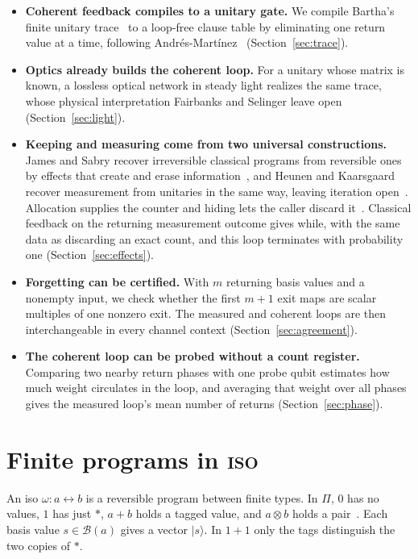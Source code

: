\documentclass[acmsmall,screen,review,anonymous,nonacm]{acmart}
\newcommand{\storyinlineface}{\small\ttfamily}
\newcommand{\code}[1]{\textnormal{\storyinlineface #1}}
\newcommand{\ket}[1]{\lvert #1\rangle}
\numberwithin{equation}{section}
\begin{document}
\begin{itemize}
\item \textbf{Coherent feedback compiles to a unitary gate.} We compile Bartha's finite unitary trace~\cite[Thm.~8]{Bartha14QuantumTuringAutomata} to a loop-free clause table by eliminating one return value at a time, following Andr\'es-Mart\'inez~\cite[proof of Thm.~3.3.15]{AndresMartinez22Thesis} (Section~\ref{sec:trace}).
\item \textbf{Optics already builds the coherent loop.} For a unitary whose matrix is known, a
  lossless optical network in steady light realizes the same trace, whose physical interpretation
  Fairbanks and Selinger leave
  open~\cite[\S~1, App.~B]{FairbanksSelinger25Traces} (Section~\ref{sec:light}).
\item \textbf{Keeping and measuring come from two universal constructions.}
  James and Sabry recover irreversible classical programs from reversible ones by effects
  that create and erase information~\cite{JamesSabry12InformationEffects}, and Heunen and
  Kaarsgaard recover measurement from unitaries in the same way, leaving iteration open~\cite[\S~7]{HeunenKaarsgaard22Effects}.
  Allocation supplies the counter and hiding lets the caller discard it~\cite{HeunenKaarsgaard22Effects,HuotStaton18}.
  Classical feedback on the returning measurement outcome gives \code{while}, with the same data as discarding an exact count, and this loop terminates with probability one (Section~\ref{sec:effects}).
\item \textbf{Forgetting can be certified.} With $m$ returning basis values and a nonempty input,
  we check whether the first $m+1$ exit maps are scalar multiples of one nonzero exit.
  The measured and coherent loops are then interchangeable in every channel context (Section~\ref{sec:agreement}).
\item \textbf{The coherent loop can be probed without a count register.}
  Comparing two nearby return phases with one probe qubit estimates how much weight circulates
  in the loop, and averaging that weight over all phases gives the measured loop's mean number of returns
  (Section~\ref{sec:phase}).
\end{itemize}

\section{Finite programs in \textsc{iso}}\label{sec:iso}
An iso $\omega:a\leftrightarrow b$ is a reversible program between finite types.
In $\Pi$, $0$ has no values, $1$ has just $*$, $a+b$ holds a tagged value, and
$a\otimes b$ holds a pair~\cite[\S~3.1]{HeunenKaarsgaard22Effects}. Each basis value
$s\in\mathcal B(a)$ gives a vector $\ket s$. In $1+1$ only the tags distinguish the two copies of $*$.
\end{document}
